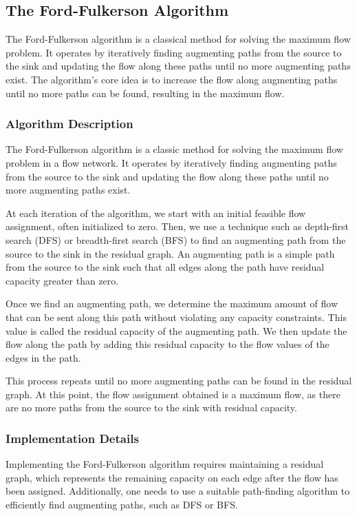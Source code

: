 \documentclass[12pt]{book} %
\begin{document}
\subsection{The Ford-Fulkerson Algorithm}
The Ford-Fulkerson algorithm is a classical method for solving the maximum flow problem. It operates by iteratively finding augmenting paths from the source to the sink and updating the flow along these paths until no more augmenting paths exist. The algorithm's core idea is to increase the flow along augmenting paths until no more paths can be found, resulting in the maximum flow.

\subsubsection{Algorithm Description}
The Ford-Fulkerson algorithm is a classic method for solving the maximum flow problem in a flow network. It operates by iteratively finding augmenting paths from the source to the sink and updating the flow along these paths until no more augmenting paths exist.

At each iteration of the algorithm, we start with an initial feasible flow assignment, often initialized to zero. Then, we use a technique such as depth-first search (DFS) or breadth-first search (BFS) to find an augmenting path from the source to the sink in the residual graph. An augmenting path is a simple path from the source to the sink such that all edges along the path have residual capacity greater than zero.

Once we find an augmenting path, we determine the maximum amount of flow that can be sent along this path without violating any capacity constraints. This value is called the residual capacity of the augmenting path. We then update the flow along the path by adding this residual capacity to the flow values of the edges in the path.

This process repeats until no more augmenting paths can be found in the residual graph. At this point, the flow assignment obtained is a maximum flow, as there are no more paths from the source to the sink with residual capacity.


\subsubsection{Implementation Details}
Implementing the Ford-Fulkerson algorithm requires maintaining a residual graph, which represents the remaining capacity on each edge after the flow has been assigned. Additionally, one needs to use a suitable path-finding algorithm to efficiently find augmenting paths, such as DFS or BFS.
\end{document}
